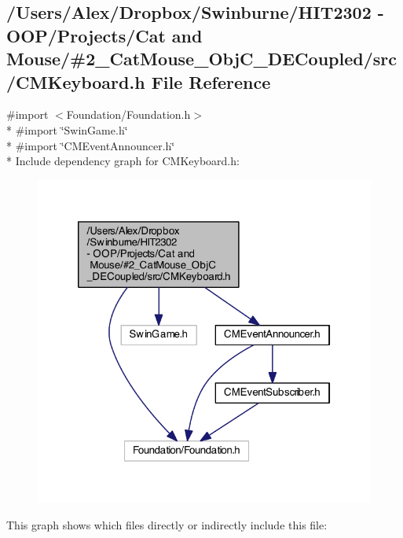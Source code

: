 \subsection{/\-Users/\-Alex/\-Dropbox/\-Swinburne/\-H\-I\-T2302 -\/ O\-O\-P/\-Projects/\-Cat and Mouse/\#2\-\_\-\-Cat\-Mouse\-\_\-\-Obj\-C\-\_\-\-D\-E\-Coupled/src/\-C\-M\-Keyboard.h File Reference}
\label{_c_m_keyboard_8h}
{\ttfamily \#import $<$Foundation/\-Foundation.\-h$>$}\\*
{\ttfamily \#import \char`\"{}Swin\-Game.\-h\char`\"{}}\\*
{\ttfamily \#import \char`\"{}C\-M\-Event\-Announcer.\-h\char`\"{}}\\*
Include dependency graph for C\-M\-Keyboard.\-h\-:
\nopagebreak
\begin{figure}[H]
\begin{center}
\leavevmode
\includegraphics[width=322pt]{_c_m_keyboard_8h__incl}
\end{center}
\end{figure}
This graph shows which files directly or indirectly include this file\-:
\nopagebreak
